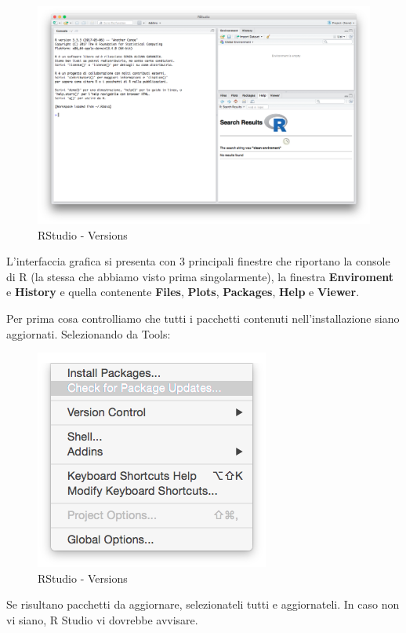 \documentclass[]{book}
\begin{document}
\begin{figure}
\centering
\includegraphics{./media/Rstudio_blank.png}
\caption{RStudio - Versions}
\end{figure}

L'interfaccia grafica si presenta con 3 principali finestre che riportano la console di R (la stessa che abbiamo visto prima singolarmente), la finestra \textbf{Enviroment} e \textbf{History} e quella contenente \textbf{Files}, \textbf{Plots}, \textbf{Packages}, \textbf{Help} e \textbf{Viewer}.

Per prima cosa controlliamo che tutti i pacchetti contenuti nell'installazione siano aggiornati. Selezionando da Tools:

\begin{figure}
\centering
\includegraphics{./media/Rstudio_tool.png}
\caption{RStudio - Versions}
\end{figure}

Se risultano pacchetti da aggiornare, selezionateli tutti e aggiornateli. In caso non vi siano, R Studio vi dovrebbe avvisare.
\end{document}
